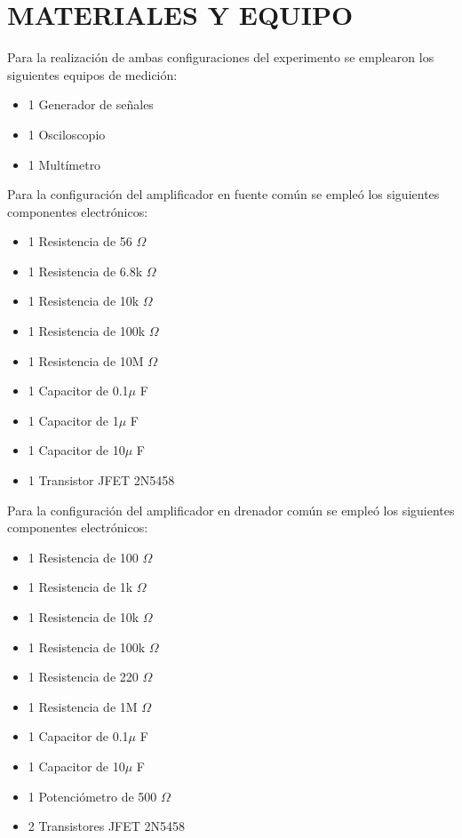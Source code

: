 \documentclass[journal]{IEEEtran}
\begin{document}
\section{MATERIALES Y EQUIPO}
Para la realización de ambas configuraciones del experimento se emplearon los siguientes equipos de medición:
\begin{itemize}
    \item 1 Generador de señales
    \item 1 Osciloscopio
    \item 1 Multímetro
\end{itemize}
\par Para la configuración del amplificador en fuente común se empleó los siguientes componentes electrónicos:
\begin{itemize}
    \item 1 Resistencia de 56 $\Omega$
    \item 1 Resistencia de 6.8k $\Omega$
    \item 1 Resistencia de 10k $\Omega$
    \item 1 Resistencia de 100k $\Omega$
    \item 1 Resistencia de 10M $\Omega$
    \item 1 Capacitor de 0.1$\mu$ F
    \item 1 Capacitor de 1$\mu$ F
    \item 1 Capacitor de 10$\mu$ F
    \item 1 Transistor JFET 2N5458 
\end{itemize}
\par Para la configuración del amplificador en drenador común se empleó los siguientes componentes electrónicos:
\begin{itemize}
    \item 1 Resistencia de 100 $\Omega$
    \item 1 Resistencia de 1k $\Omega$
    \item 1 Resistencia de 10k $\Omega$
    \item 1 Resistencia de 100k $\Omega$
    \item 1 Resistencia de 220 $\Omega$
    \item 1 Resistencia de 1M $\Omega$
    \item 1 Capacitor de 0.1$\mu$ F
    \item 1 Capacitor de 10$\mu$ F
    \item 1 Potenciómetro de 500 $\Omega$
    \item 2 Transistores JFET 2N5458
\end{itemize}
\end{document}
